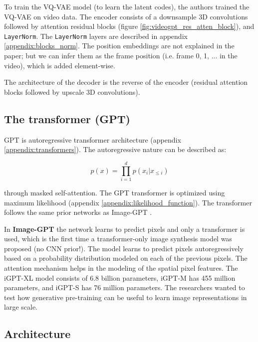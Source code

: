 To train the VQ-VAE model (to learn the latent codes), the authors trained the VQ-VAE on video data. The encoder consists of a downsample 3D convolutions followed by attention residual blocks (figure \ref{fig:videogpt_res_atten_block}), and \texttt{LayerNorm}. The \texttt{LayerNorm} layers are described in appendix \ref{appendix:blocks_norm}. The position embeddings are not explained in the paper; but we can infer them as the frame position (i.e. frame 0, 1, ... in the video), which is added element-wise.

The architecture of the decoder is the reverse of the encoder (residual attention blocks followed by upscale 3D convolutions).








\subsection*{The transformer (GPT)}

GPT is autoregressive transformer architecture (appendix \ref{appendix:transformers}). The autoregressive nature can be described as:

\[ p(x) = \prod_{i=1}^{d} p(x_i | x_{\leq i}) \] 

through masked self-attention. The GPT transformer is optimized using maximum likelihood (appendix \ref{appendix:likelihood_function}). The transformer follows the same prior networks as Image-GPT \cite{imagegpt}.

In \textbf{Image-GPT} the network learns to predict pixels and only a transformer is used, which is the first time a transformer-only image synthesis model was proposed (no CNN prior!). The model learns to predict pixels autoregressively based on a probability distribution modeled on each of the previous pixels. The attention mechanism helps in the modeling of the spatial pixel features. The iGPT-XL model consists of 6.8 billion parameters, iGPT-M has 455 million parameters, and iGPT-S has 76 million parameters. The researchers wanted to test how generative pre-training can be useful to learn image representations in large scale.










\subsection{Architecture}

